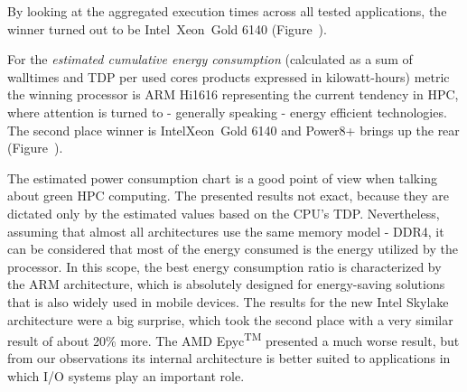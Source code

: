 By looking at the aggregated execution times across all tested applications, the winner turned out to be Intel\textregistered\ Xeon\textregistered\ Gold 6140 (Figure~).



For the \textit{estimated cumulative energy consumption} (calculated as a sum of walltimes and TDP per used cores products expressed in kilowatt-hours) metric the winning processor is ARM Hi1616 representing the current tendency in HPC, where attention is turned to - generally speaking - energy efficient technologies. The second place winner is Intel\textregistered Xeon\textregistered\ Gold 6140 and Power8+ brings up the rear (Figure~). 

The estimated power consumption chart is a good point of view when talking about green HPC computing. The presented results not exact, because they are dictated only by the estimated values based on the CPU's TDP. Nevertheless, assuming that almost all architectures use the same memory model - DDR4, it can be considered that most of the energy consumed is the energy utilized by the processor. In this scope, the best energy consumption ratio is characterized by the ARM architecture, which is absolutely designed for energy-saving solutions that is also widely used in mobile devices. The results for the new Intel Skylake architecture were a big surprise, which took the second place with a very similar result of about 20\% more. The AMD Epyc\textsuperscript{TM} presented a much worse result, but from our observations its internal architecture is better suited to applications in which I/O systems play an important role.

